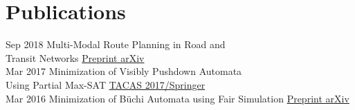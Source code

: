 \documentclass[letterpaper]{twentysecondcv} %
\begin{document}
\vspace{6mm}


\section{Publications}
\begin{twenty} %
	\twentyitem
    		{Sep 2018}
		{}
        		{Multi-Modal Route Planning in Road and\\Transit Networks}
        		{\href{https://arxiv.org/abs/1809.05481}{Preprint arXiv}}
        		{}
        		{}\\
	\twentyitem
    		{Mar 2017}
		{}
        		{Minimization of Visibly Pushdown Automata\\Using Partial Max-SAT}
        		{\href{https://link.springer.com/chapter/10.1007/978-3-662-54577-5_27}{TACAS 2017/Springer}}
        		{}
        		{}\\
        	\twentyitem
    		{Mar 2016}
		{}
        		{Minimization of Büchi Automata using Fair Simulation}
        		{\href{https://arxiv.org/abs/1603.01107}{Preprint arXiv}}
        		{}
        		{}
\end{twenty}

\vspace{6mm}

\end{document}
